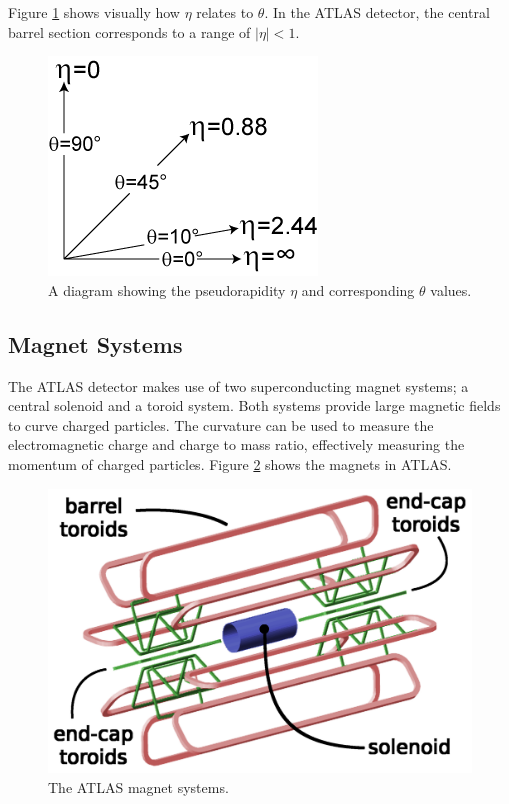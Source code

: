 	Figure \ref{fig:pseudorapidity} shows visually how $\eta$ relates to $\theta$. In the ATLAS detector, the central barrel section corresponds to a range of $|\eta|<1$. 

	\begin{figure}[!ht]
	\centering
	\includegraphics[width=.25\textwidth,keepaspectratio=true]{chapters/chapter3_experiment/images/Pseudorapidity.png}
	\caption{ A diagram showing the pseudorapidity $\eta$ and corresponding $\theta$ values. \cite{pseudorapidity} }
	\label{fig:pseudorapidity}
	\end{figure}

	\subsection{Magnet Systems}\label{ssec:magnets}
	The ATLAS detector makes use of two superconducting magnet systems; a central solenoid and a toroid system. Both systems provide large magnetic fields to curve charged particles. The curvature can be used to measure the electromagnetic charge and charge to mass ratio, effectively measuring the momentum of charged particles. Figure \ref{fig:ATLAS-magnets} shows the magnets in ATLAS.

	\begin{figure}[!ht]
	\centering
	\includegraphics[width=.65\textwidth,keepaspectratio=true]{chapters/chapter3_experiment/images/magnetSystems.png}
	\caption{ The ATLAS magnet systems.}
	\label{fig:ATLAS-magnets}
	\end{figure}

